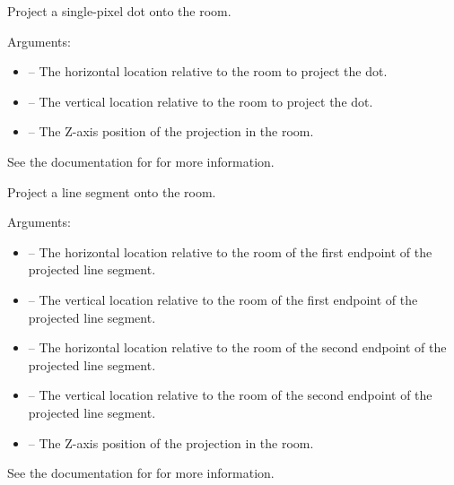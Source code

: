 \documentclass[letterpaper,10pt,english]{sphinxmanual}
\begin{document}

\begin{fulllineitems}
\label{dsp:sge.dsp.Room.project_dot}
Project a single-pixel dot onto the room.

Arguments:
\begin{itemize}
\item {} 
 -- The horizontal location relative to the room to
project the dot.

\item {} 
 -- The vertical location relative to the room to project
the dot.

\item {} 
 -- The Z-axis position of the projection in the room.

\end{itemize}

See the documentation for {\hyperref[gfx:sge.gfx.Sprite.draw_dot]{\emph{}}} for
more information.

\end{fulllineitems}


\begin{fulllineitems}
\label{dsp:sge.dsp.Room.project_line}
Project a line segment onto the room.

Arguments:
\begin{itemize}
\item {} 
 -- The horizontal location relative to the room of the
first endpoint of the projected line segment.

\item {} 
 -- The vertical location relative to the room of the
first endpoint of the projected line segment.

\item {} 
 -- The horizontal location relative to the room of the
second endpoint of the projected line segment.

\item {} 
 -- The vertical location relative to the room of the
second endpoint of the projected line segment.

\item {} 
 -- The Z-axis position of the projection in the room.

\end{itemize}

See the documentation for {\hyperref[gfx:sge.gfx.Sprite.draw_line]{\emph{}}} for
more information.

\end{fulllineitems}
\end{document}
